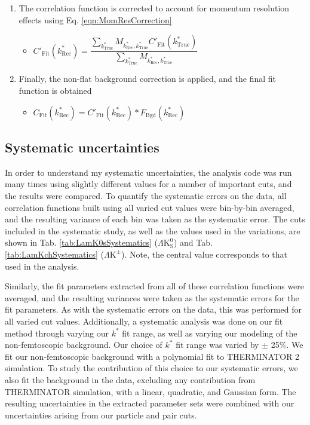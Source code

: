\documentclass[ALICE,manyauthors]{cernphprep}
\newcommand{\kstar}{$k^{*}$\xspace}
\newcommand{\LamKpm}{$\Lambda\mathrm{K^{\pm}}$\xspace}
\newcommand{\LamKs}{$\Lambda\mathrm{K^{0}_{S}}$\xspace}
\begin{document}
\begin{enumerate}
\begin{itemize}
 \end{itemize} 
 \item The correlation function is corrected to account for momentum resolution effects using Eq. \ref{eqn:MomResCorrection}
 \begin{itemize}
  \item $C'_{\mathrm{Fit}}(k^{*}_{\mathrm{Rec}}) = \dfrac{\sum\limits_{k^{*}_{\mathrm{True}}}M_{k^{*}_{\mathrm{Rec}},k^{*}_{\mathrm{True}}}C'_{\mathrm{Fit}}(k^{*}_{\mathrm{True}})}{\sum\limits_{k^{*}_{\mathrm{True}}}M_{k^{*}_{\mathrm{Rec}},k^{*}_{\mathrm{True}}}}$
 \end{itemize}
 \item Finally, the non-flat background correction is applied, and the final fit function is obtained
 \begin{itemize}
  \item $C_{\mathrm{Fit}}(k^{*}_{\mathrm{Rec}}) = C'_{\mathrm{Fit}}(k^{*}_{\mathrm{Rec}})*F_{\mathrm{Bgd}}(k^{*}_{\mathrm{Rec}})$
 \end{itemize}
\end{enumerate}

\subsection{Systematic uncertainties}
\label{SysErrs}

In order to understand my systematic uncertainties, the analysis code was run many times using slightly different values for a number of important cuts, and the results were compared.  
To quantify the systematic errors on the data, all correlation functions built using all varied cut values were bin-by-bin averaged, and the resulting variance of each bin was taken as the systematic error.  
The cuts included in the systematic study, as well as the values used in the variations, are shown in Tab. \ref{tab:LamK0sSystematics} (\LamKs) and Tab. \ref{tab:LamKchSystematics} (\LamKpm).  
Note, the central value corresponds to that used in the analysis.

Similarly, the fit parameters extracted from all of these correlation functions were averaged, and the resulting variances were taken as the systematic errors for the fit parameters.
As with the systematic errors on the data, this was performed for all varied cut values.
Additionally, a systematic analysis was done on our fit method through varying our \kstar fit range, as well as varying our modeling of the non-femtoscopic background.
Our choice of \kstar fit range was varied by $\pm$ 25\%. 
We fit our non-femtoscopic background with a polynomial fit to THERMINATOR 2 simulation.   
To study the contribution of this choice to our systematic errors, we also fit the background in the data, excluding any contribution from THERMINATOR simulation, with a linear, quadratic, and Gaussian form. 
The resulting uncertainties in the extracted parameter sets were combined with our uncertainties arising from our particle and pair cuts.
\end{document}
